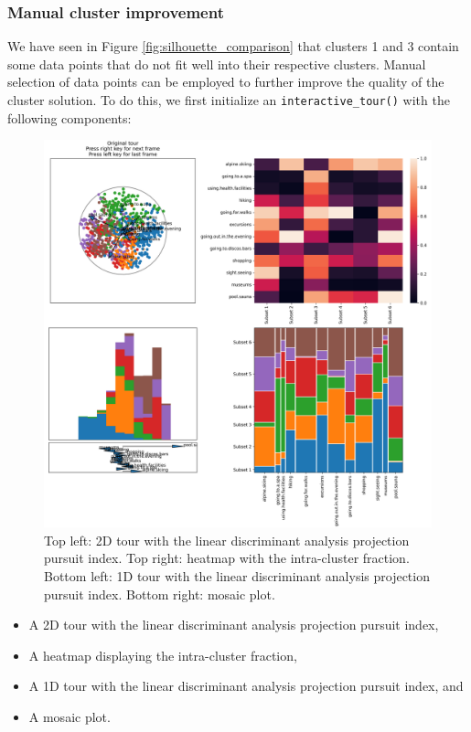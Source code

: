 \documentclass[article]{ajs}
\begin{document}
\subsubsection{Manual cluster improvement}

We have seen in Figure \ref{fig:silhouette_comparison} that clusters 1 and 3 contain some data points that do not fit well into their respective clusters. Manual selection of data points can be employed to further improve the quality of the cluster solution. To do this, we first initialize an \texttt{interactive\_tour()} with the following components:

\begin{figure}[h!]
    \centering
    \includegraphics[width=1\textwidth]{winter_cl7_init.png}
    \caption{Top left: 2D tour with the linear discriminant analysis projection pursuit index. Top right: heatmap with the intra-cluster fraction. Bottom left: 1D tour with the linear discriminant analysis projection pursuit index. Bottom right: mosaic plot.}
    \label{fig:winter_cl7_init}
\end{figure}

\begin{itemize}
    \item A 2D tour with the linear discriminant analysis projection pursuit index,
    \item A heatmap displaying the intra-cluster fraction,
    \item A 1D tour with the linear discriminant analysis projection pursuit index, and
    \item A mosaic plot.
\end{itemize}
\end{document}
